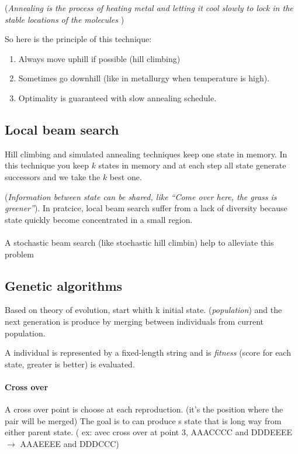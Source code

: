 (\textit{Annealing is the process of heating metal and letting it cool slowly to lock in the stable locations of the molecules} )

So here is the principle of this technique:
\begin{enumerate}
	\item Always move uphill if possible (hill climbing)
	\item Sometimes go downhill (like in metallurgy when temperature is high).
	\item Optimality is guaranteed with slow annealing schedule. 
\end{enumerate}


\subsection{Local beam search}

Hill climbing and simulated annealing techniques keep one state in memory. 
In this technique you keep $k$ states in memory and at each step all state 
generate successors and we take the $k$ best one.

(\textit{Information between state can be shared, like
``Come over here, the grass is greener''}).
In pratcice, local beam search suffer from a lack of diversity because
state quickly become concentrated in a small region.


\paragraph{ } A stochastic beam search (like stochastic hill climbin)
help to alleviate this problem


\subsection{Genetic algorithms}  

Based on theory  of  evolution, start  whith  k initial  state.
(\textit{population})  and the  next  generation is  produce by  merging
between individuals from current population. 

A individual is represented by a fixed-length string and is \textit{fitness}
(score for each state, greater is better) is evaluated.

\paragraph{Cross over} A cross over point is choose at each reproduction. (it's the position where
the pair will be merged)
The goal is to can produce s state that is long way from either parent state.
( ex: avec cross over at point 3, AAACCCC and DDDEEEE $\to$ AAAEEEE and DDDCCC)


